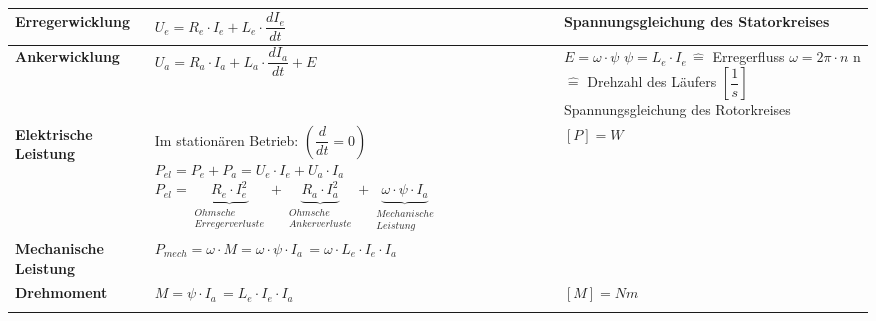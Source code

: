 \\
\renewcommand{\arraystretch}{2.5}
\begin{tabular}[b]{| C{4cm} | P{7cm} | P{7cm} |}
\hline
\textbf{Erregerwicklung}	& $U_e = R_e\cdot I_e + L_e\cdot\dfrac{dI_e}{dt}$ & Spannungsgleichung des Statorkreises\\
\hline
\textbf{Ankerwicklung}	& $U_a = R_a \cdot I_a + L_a \cdot \dfrac{dI_a}{dt} + E$ & $E = \omega\cdot\psi$ \qquad $\psi = L_e\cdot I_e \, \widehat{=}$ Erregerfluss \newline \newline $\omega = 2\pi\cdot n$ \newline \quad n $\widehat{=}$ Drehzahl des Läufers $\left[\dfrac{1}{s}\right]$\newline \newline Spannungsgleichung des Rotorkreises\\
\hline
\textbf{Elektrische Leistung} & Im stationären Betrieb: \quad $\left(\dfrac{d}{dt} = 0\right)$ \newline \newline $P_{el} = P_e + P_a = U_e\cdot I_e + U_a\cdot I_a$ \newline \newline $P_{el} = \underbrace{R_e\cdot I_e^2}_{\substack{Ohmsche \\ Erregerverluste}} + \underbrace{R_a\cdot I_a^2}_{\substack{Ohmsche \\ Ankerverluste}} + \underbrace{\omega\cdot\psi\cdot I_a}_{\substack{Mechanische\\Leistung}}$ \newline & $[P] = W$ \\
\hline
\textbf{Mechanische Leistung} & $P_{mech} = \omega\cdot M = \omega\cdot\psi\cdot I_a\, = \omega\cdot L_e \cdot I_e \cdot I_a$ & \\
\hline
\textbf{Drehmoment} & $M = \psi\cdot I_a\, = L_e\cdot I_e\cdot I_a$ & $[M] = Nm$ \\
	\lasthline
\end{tabular}
\clearpage
\newpage
